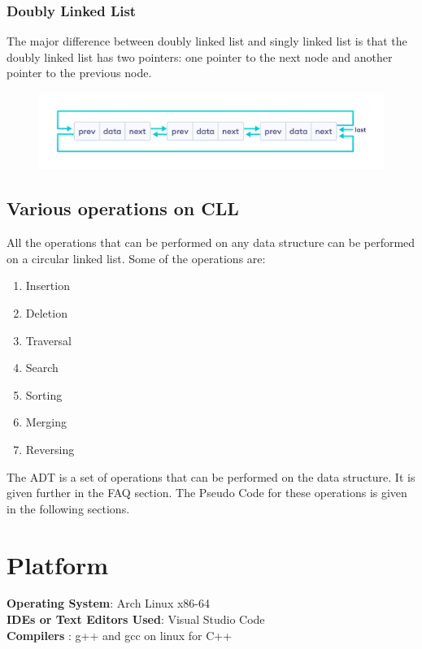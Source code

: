 \documentclass[11pt]{article}
\begin{document}
\subsubsection{Doubly Linked List}

The major difference between doubly linked list and singly linked list is that the doubly linked list has two pointers: one pointer to the next node and another pointer to the previous node.

\begin{figure}[H]
	\begin{small}
		\begin{center}
			\includegraphics[scale=0.5]{circular-doubly-linked-list.png}
		\end{center}
		\caption{}
		\label{fig:}
	\end{small}
\end{figure}

\subsection{Various operations on CLL}
All the operations that can be performed on any data structure can be performed on a circular linked list. Some of the operations are:
\begin{enumerate}
	\item Insertion
	\item Deletion
	\item Traversal
	\item Search
	\item Sorting
	\item Merging
	\item Reversing
\end{enumerate}

The ADT is a set of operations that can be performed on the data structure. It is given further in the FAQ section. The Pseudo Code for these operations is given in the following sections.


\section{Platform}
\textbf{Operating System}: Arch Linux x86-64 \\
\textbf{IDEs or Text Editors Used}: Visual Studio Code\\
\textbf{Compilers} : g++ and gcc on linux for C++\\
\end{document}
